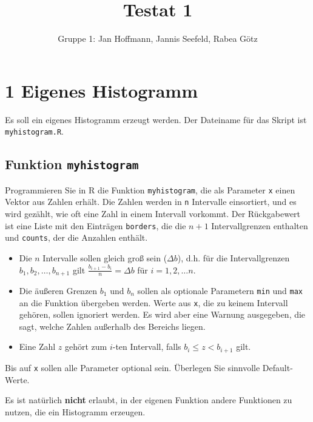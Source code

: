 \documentclass[
]{article}
\title{Testat 1}
\author{Gruppe 1: Jan Hoffmann, Jannis Seefeld, Rabea Götz}
\date{}
\providecommand{\tightlist}{%
  \setlength{\itemsep}{0pt}\setlength{\parskip}{0pt}}
\begin{document}
\maketitle

\hypertarget{eigenes-histogramm}{%
\section{1 Eigenes Histogramm}\label{eigenes-histogramm}}

Es soll ein eigenes Histogramm erzeugt werden. Der Dateiname für das
Skript ist \texttt{myhistogram.R}.

\hypertarget{funktion-myhistogram}{%
\subsection{\texorpdfstring{Funktion
\texttt{myhistogram}}{Funktion myhistogram}}\label{funktion-myhistogram}}

Programmieren Sie in R die Funktion \texttt{myhistogram}, die als
Parameter \texttt{x} einen Vektor aus Zahlen erhält. Die Zahlen werden
in \texttt{n} Intervalle einsortiert, und es wird gezählt, wie oft eine
Zahl in einem Intervall vorkommt. Der Rückgabewert ist eine Liste mit
den Einträgen \texttt{borders}, die die \(n+1\) Intervallgrenzen
enthalten und \texttt{counts}, der die Anzahlen enthält.

\begin{itemize}
\tightlist
\item
  Die \(n\) Intervalle sollen gleich groß sein (\(\Delta b\)), d.h. für
  die Intervallgrenzen \(b_1, b_2, \ldots, b_{n+1}\) gilt
  \(\frac{b_{i+1}-b_{i}}{n}=\Delta b\) für \(i=1, 2, \ldots n\).
\item
  Die äußeren Grenzen \(b_1\) und \(b_n\) sollen als optionale
  Parametern \texttt{min} und \texttt{max} an die Funktion übergeben
  werden. Werte aus \texttt{x}, die zu keinem Intervall gehören, sollen
  ignoriert werden. Es wird aber eine Warnung ausgegeben, die sagt,
  welche Zahlen außerhalb des Bereichs liegen.
\item
  Eine Zahl \(z\) gehört zum \(i\)-ten Intervall, falls
  \(b_i \leq z < b_{i+1}\) gilt.
\end{itemize}

Bis auf \texttt{x} sollen alle Parameter optional sein. Überlegen Sie
sinnvolle Default-Werte.

Es ist natürlich \textbf{nicht} erlaubt, in der eigenen Funktion andere
Funktionen zu nutzen, die ein Histogramm erzeugen.
\end{document}
